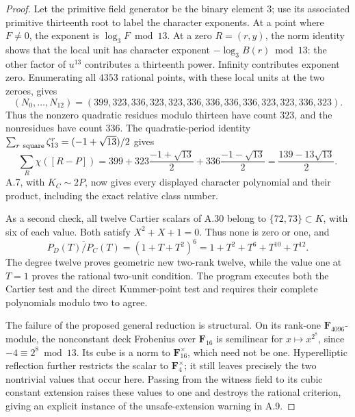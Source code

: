 \documentclass[11pt]{article}
\begin{document}
\begin{proof}
Let the primitive field generator be the binary element \(3\);
use its associated primitive thirteenth root to label the
character exponents. At a point where \(F\ne0\), the exponent is
\(\log_3F\bmod13\). At a zero \(R=(r,y)\), the norm identity
shows that the local unit has character exponent
\(-\log_3B(r)\bmod13\): the other factor of \(u^{13}\) contributes
a thirteenth power. Infinity contributes exponent zero.
Enumerating all \(4353\) rational points, with these local units
at the two zeroes, gives
\[
 (N_0,\ldots,N_{12})
  =(399,323,336,323,323,336,336,336,336,323,323,336,323).
\]
Thus the nonzero quadratic residues modulo thirteen have count
\(323\), and the nonresidues have count \(336\).
The quadratic-period identity
\(\sum_{r\ {\rm square}}\zeta_{13}^r=(-1+\sqrt{13})/2\)
gives
\[
 \sum_R\chi([R-P])
 =399+323\frac{-1+\sqrt{13}}2
       +336\frac{-1-\sqrt{13}}2
 =\frac{139-13\sqrt{13}}2.
\]
A.7, with \(K_C\sim2P\), now gives every displayed
character polynomial and their product, including the exact
relative class number.

As a second check, all twelve Cartier scalars of A.30 belong to
\(\{72,73\}\subset K\), with six of each value.
Both satisfy \(X^2+X+1=0\). Thus none is zero or one, and
\[
 \overline{P_D(T)/P_C(T)}
   =(1+T+T^2)^6=1+T^2+T^6+T^{10}+T^{12}.
\]
The degree twelve proves geometric new two-rank twelve, while
the value one at \(T=1\) proves the rational two-unit condition.
The program  executes
both the Cartier test and the direct Kummer-point test and
requires their complete polynomials modulo two to agree.

The failure of the proposed general reduction is structural.
On its rank-one \(\mathbf F_{4096}\)-module, the nonconstant
deck Frobenius over \(\mathbf F_{16}\) is semilinear for
\(x\mapsto x^{2^8}\), since \(-4\equiv2^8\bmod13\).
Its cube is a norm to \(\mathbf F_{16}^{\times}\), which need
not be one. Hyperelliptic reflection further restricts the scalar
to \(\mathbf F_4^\times\); it still leaves precisely the two
nontrivial values that occur here. Passing from the witness field
to its cubic constant extension raises these values to one and
destroys the rational criterion, giving an explicit instance of
the unsafe-extension warning in A.9.
\end{proof}
\end{document}
